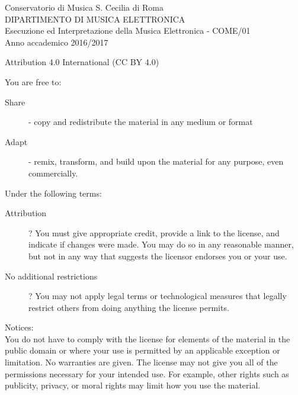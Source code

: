 \thispagestyle{empty}

Conservatorio di Musica S. Cecilia di Roma \\
DIPARTIMENTO DI MUSICA ELETTRONICA \\
Esecuzione ed Interpretazione della Musica Elettronica - COME/01 \\
Anno accademico 2016/2017
\vfill

Attribution 4.0 International (CC BY 4.0)

You are free to:
\begin{description}
	\item[Share] - copy and redistribute the material in any medium or format
	\item[Adapt] - remix, transform, and build upon the material for any purpose, even commercially.
\end{description}

Under the following terms:
\begin{description}
	\item[Attribution] ? You must give appropriate credit, provide a link to the license, and indicate if
	changes were made. You may do so in any reasonable manner, but not in any way that suggests the licensor
	endorses you or your use.
	\item[No additional restrictions] ? You may not apply legal terms or technological measures that legally
	restrict others from doing anything the license permits.
\end{description}

Notices:\\
You do not have to comply with the license for elements of the material in the public domain or where your
use is permitted by an applicable exception or limitation. No warranties are given. The license may not give
you all of the permissions necessary for your intended use. For example, other rights such as publicity,
privacy, or moral rights may limit how you use the material.